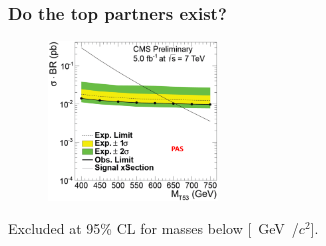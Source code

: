 \documentclass[ukenglish]{beamer}
\begin{document}
\begin{frame}
    \frametitle{Do the top partners exist?}
    \begin{figure}[h]
        \centering
            \includegraphics[width=0.4\textwidth]{limit}
    \end{figure}
    Excluded at 95\% CL for masses below \unit[655][GeV/$c^2]$.
\end{frame}
\end{document}
